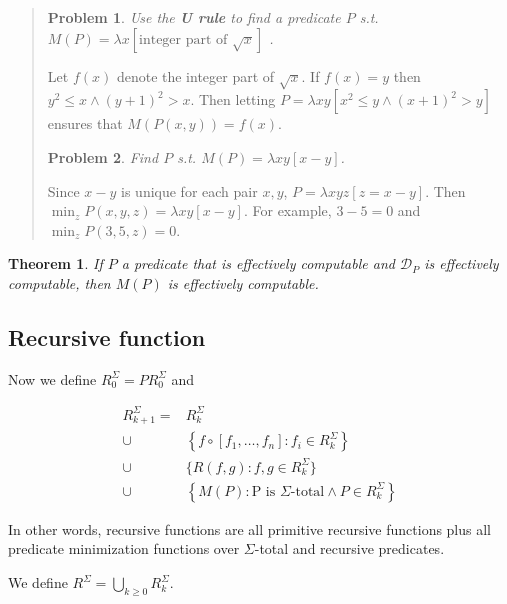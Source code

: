 \documentclass[a4paper, 12pt]{article}
\newtheorem{problem}{Problem}
\newtheorem{theorem}{Theorem}
\newtheorem{problem}{Problem}
\newtheorem{theorem}{Theorem}
\begin{document}
\small
\begin{quote}


\begin{problem}
    Use the \textbf{U rule} to find a predicate $P$ s.t. $M(P) = \lambda
    x[\text{integer part of } \sqrt{x}]$ .
\end{problem}

Let $f(x)$ denote the integer part of $\sqrt{x}$. If $f(x) = y$ then $y^2 \leq x
\land (y+1)^2 > x$. Then letting $P = \lambda xy\left[ x^2 \leq y \land (x +
1)^2 > y \right] $ ensures that $M(P(x, y)) = f(x)$.

\begin{problem}
    Find $P$ s.t. $M(P) = \lambda xy\left[ x - y \right] $.
\end{problem}

Since $x - y$ is unique for each pair $x, y$, $P = \lambda xyz [z = x - y]$. Then
$\min_z P(x, y, z) = \lambda xy[x - y]$. For example, $3 - 5 = 0$ and $\min_z
P(3, 5, z) = 0$.

\end{quote}
\normalsize


\begin{theorem}
    If $P$ a predicate that is effectively computable and $\mathcal{D}_P$ is
    effectively computable, then $M(P)$ is effectively computable.
\end{theorem}

\subsection{Recursive function}

Now we define $R_0^{\Sigma} = PR_0^{\Sigma}$ and 

\begin{align*}
    R_{k+1}^{\Sigma} = &R_k^{\Sigma} \\ \cup &\left\{ f \circ \left[ f_1, \ldots,
    f_n \right] : f_i \in R_{k}^{\Sigma} \right\} \\ \cup &\{R(f, g) : f, g \in
R_k^{\Sigma}\} \\ \cup & \left\{M(P) : \text{P is $\Sigma$-total} \land P \in
R_k^{\Sigma}\right\}
\end{align*}

In other words, recursive functions are all primitive recursive functions plus
all predicate minimization functions over $\Sigma$-total and recursive
predicates.

We define $R^{\Sigma} = \bigcup_{k\geq 0} R_{k}^{\Sigma}$.
\end{document}
